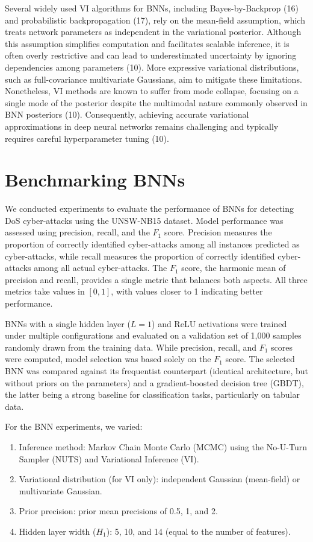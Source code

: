 \documentclass[
  a4paper,
]{scrreprt}
\providecommand{\tightlist}{%
  \setlength{\itemsep}{0pt}\setlength{\parskip}{0pt}}
\begin{document}
Several widely used VI algorithms for BNNs, including Bayes-by-Backprop
(16) and probabilistic backpropagation (17), rely on the mean-field
assumption, which treats network parameters as independent in the
variational posterior. Although this assumption simplifies computation
and facilitates scalable inference, it is often overly restrictive and
can lead to underestimated uncertainty by ignoring dependencies among
parameters (10). More expressive variational distributions, such as
full-covariance multivariate Gaussians, aim to mitigate these
limitations. Nonetheless, VI methods are known to suffer from mode
collapse, focusing on a single mode of the posterior despite the
multimodal nature commonly observed in BNN posteriors (10).
Consequently, achieving accurate variational approximations in deep
neural networks remains challenging and typically requires careful
hyperparameter tuning (10).

\section{Benchmarking BNNs}\label{benchmarking-bnns}

We conducted experiments to evaluate the performance of BNNs for
detecting DoS cyber-attacks using the UNSW-NB15 dataset. Model
performance was assessed using precision, recall, and the \(F_1\) score.
Precision measures the proportion of correctly identified cyber-attacks
among all instances predicted as cyber-attacks, while recall measures
the proportion of correctly identified cyber-attacks among all actual
cyber-attacks. The \(F_1\) score, the harmonic mean of precision and
recall, provides a single metric that balances both aspects. All three
metrics take values in \([0,1]\), with values closer to 1 indicating
better performance.

BNNs with a single hidden layer (\(L = 1\)) and ReLU activations were
trained under multiple configurations and evaluated on a validation set
of 1,000 samples randomly drawn from the training data. While precision,
recall, and \(F_1\) scores were computed, model selection was based
solely on the \(F_1\) score. The selected BNN was compared against its
frequentist counterpart (identical architecture, but without priors on
the parameters) and a gradient-boosted decision tree (GBDT), the latter
being a strong baseline for classification tasks, particularly on
tabular data.

For the BNN experiments, we varied:

\begin{enumerate}
\def\labelenumi{\arabic{enumi}.}
\tightlist
\item
  Inference method: Markov Chain Monte Carlo (MCMC) using the No-U-Turn
  Sampler (NUTS) and Variational Inference (VI).
\item
  Variational distribution (for VI only): independent Gaussian
  (mean-field) or multivariate Gaussian.
\item
  Prior precision: prior mean precisions of 0.5, 1, and 2.
\item
  Hidden layer width (\(H_1\)): 5, 10, and 14 (equal to the number of
  features).
\end{enumerate}
\end{document}
